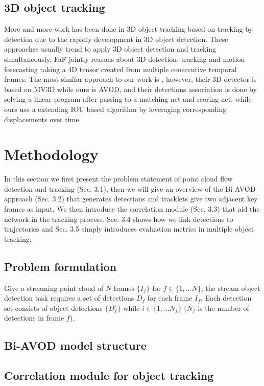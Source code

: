 \documentclass{bmvc2k}
\begin{document}
\subsection{3D object tracking}
More and more work has been done in 3D object tracking based on tracking by detection due to the rapidly development in 3D object detection. These approaches usually trend to apply 3D object detection and tracking simultaneously. FaF \cite{luo2018fast} jointly reasons about 3D detection, tracking and motion forecasting taking a 4D tensor created from multiple consecutive temporal frames. The most similar approach to our work is \cite{frossard2018end}, however, their 3D detector is based on MV3D while ours is AVOD, and their detections association is done by solving a linear program after passing to a matching net and scoring net, while ours use a extending IOU based algorithm \cite{bochinski2018extending} by leveraging corresponding displacements over time.
\section{Methodology}
\label{sec:method}
In this section we first present the problem statement of point cloud flow detection and tracking (Sec. 3.1), then we will give an overview of the Bi-AVOD approach (Sec. 3.2) that generates detections and tracklets give two adjacent key frames as input. We then introduce the correlation module (Sec. 3.3) that aid the network in the tracking process. Sec. 3.4 shows how we link detections to trajectories and Sec. 3.5 simply introduces evaluation metrics in multiple object tracking.

\subsection{Problem formulation}
Give a streaming point cloud of $N$ frames $\{I_f\}$ for $f \in \{1, ... N\}$, the stream object detection task requires a set of detections $D_f$ for each frame $I_f$. Each detection set consists of object detections $\{D^i_f\}$ while $i \in \{1,...N_f\}$ ($N_f$ is the number of detections in frame $f$).  

\subsection{Bi-AVOD model structure}


\subsection{Correlation module for object tracking}
\end{document}
